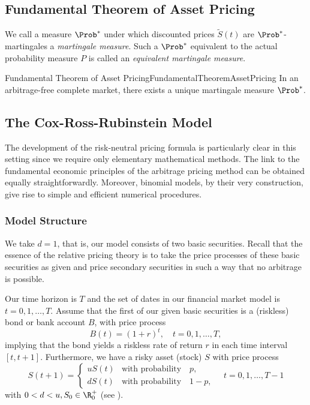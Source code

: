\subsection{Fundamental Theorem of Asset Pricing}

We call a measure $\Prob^*$ under which discounted prices $\tilde{S}(t)$ are $\Prob^*$-martingales a \textit{martingale measure}. Such a $\Prob^*$ equivalent to the actual probability measure $P$ is called an \textit{equivalent martingale measure}.

\begin{thm}{Fundamental Theorem of Asset Pricing}{FundamentalTheoremAssetPricing}
	In an arbitrage-free complete market, there exists a unique martingale measure $\Prob^*$.
\end{thm}

\subsection{The Cox-Ross-Rubinstein Model}
The development of the risk-neutral pricing formula is particularly clear in this setting since we require only elementary mathematical methods. The link to the fundamental economic principles of the arbitrage pricing method can be obtained equally straightforwardly. Moreover, binomial models, by their very construction, give rise to simple and efficient numerical procedures.

\subsubsection{Model Structure}
We take $d=1$, that is, our model consists of two basic securities. Recall that the essence of the relative pricing theory is to take the price processes of these basic securities as given and price secondary securities in such a way that no arbitrage is possible.

Our time horizon is $T$ and the set of dates in our financial market model is $t = 0, 1, \dots, T$. Assume that the first of our given basic securities is a (riskless) bond or bank account $B$, with price process
\[
	B(t) = (1+r)^t, \quad t = 0, 1, \dots, T,
\]
implying that the bond yields a riskless rate of return $r$ in each time interval $[t, t+1]$. Furthermore, we have a risky asset (stock) $S$ with price process
\[
	S(t+1) = \begin{cases}
		uS(t) & \text{with probability} \quad p,   \\
		dS(t) & \text{with probability} \quad 1-p,
	\end{cases} \quad t = 0, 1, \dots, T-1
\]
with $0 < d < u, S_0 \in \R^+_0$ (see ).

